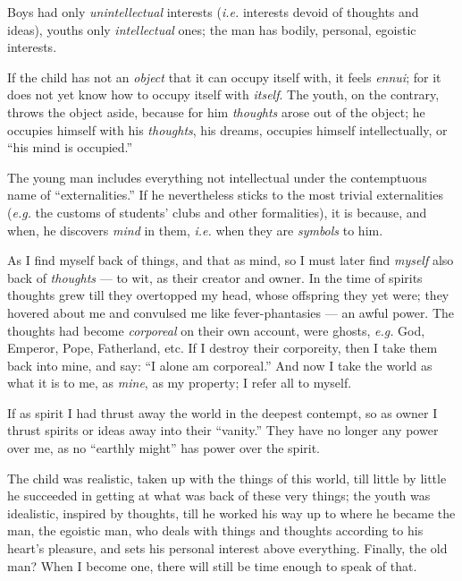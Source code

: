 Boys had only \textit{unintellectual} interests (\textit{i.e.} interests 
devoid of thoughts and ideas), youths only \textit{intellectual} ones; the man 
has bodily, personal, egoistic interests.

If the child has not an \textit{object} that it can occupy itself with, it 
feels \textit{ennui}; for it does not yet know how to occupy itself with 
\textit{itself}. The youth, on the contrary, throws the object aside, because 
for him \textit{thoughts} arose out of the object; he occupies himself with 
his \textit{thoughts}, his dreams, occupies himself intellectually, or ``his 
mind is occupied.''

The young man includes everything not intellectual under the contemptuous name 
of ``externalities.'' If he nevertheless sticks to the most trivial 
externalities (\textit{e.g.} the customs of students' clubs and other 
formalities), it is because, and when, he discovers \textit{mind} in them, 
\textit{i.e.} when they are \textit{symbols} to him.

As I find myself back of things, and that as mind, so I must later find 
\textit{myself} also back of \textit{thoughts} --- to wit, as their creator and 
owner. In the time of spirits thoughts grew till they overtopped my head, 
whose offspring they yet were; they hovered about me and convulsed me like 
fever-phantasies --- an awful power. The thoughts had become \textit{corporeal} 
on their own account, were ghosts, \textit{e.g.} God, Emperor, Pope, 
Fatherland, etc. If I destroy their corporeity, then I take them back into 
mine, and say: ``I alone am corporeal.'' And now I take the world as what it 
is to me, as \textit{mine}, as my property; I refer all to myself.

If as spirit I had thrust away the world in the deepest contempt, so as owner 
I thrust spirits or ideas away into their ``vanity.'' They have no longer 
any power over me, as no ``earthly might'' has power over the spirit.

The child was realistic, taken up with the things of this world, till little 
by little he succeeded in getting at what was back of these very things; the 
youth was idealistic, inspired by thoughts, till he worked his way up to where 
he became the man, the egoistic man, who deals with things and thoughts 
according to his heart's pleasure, and sets his personal interest above 
everything. Finally, the old man? When I become one, there will still be time 
enough to speak of that.
